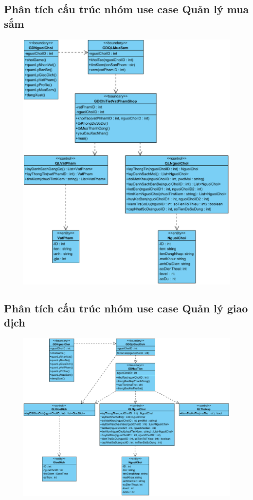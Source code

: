 \documentclass[3p]{elsarticle}
\begin{document}
\subsection{Phân tích cấu trúc nhóm use case Quản lý mua sắm}
\begin{figure}[!htbp]
	\hspace*{-.5in}
	\centering
	\includegraphics[scale=.55]{images/structure-pdfs/gamer/ShopManagement.pdf}
\end{figure}
\newpage
\subsection{Phân tích cấu trúc nhóm use case Quản lý giao dịch}
\begin{figure}[!htbp]
	\hspace*{-.5in}
	\centering
	\includegraphics[scale=.55]{images/structure-pdfs/gamer/TransactionManagement.pdf}
\end{figure}
\end{document}
